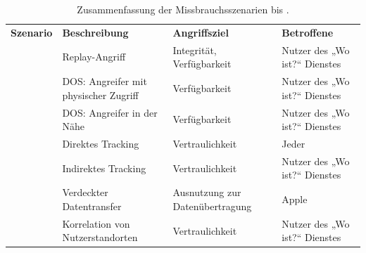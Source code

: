 \begin{table}[ht]
  \caption{Zusammenfassung der Missbrauchsszenarien  bis .}
  \label{tab:missbrauchsszenarien}
  \begin{tabularx}{\textwidth}{ |l|X|X|X| }
    \hline
    \textbf{Szenario} & \textbf{Beschreibung} & \textbf{Angriffsziel} & \textbf{Betroffene}\\
    \Xhline{0.5mm}
    \hline
    \nameref{missbrauch:1} & Replay-Angriff & Integrität, Verfügbarkeit & Nutzer des „Wo ist?“ Dienstes \\
    \hline
    \nameref{missbrauch:2.1} & \ac{DOS}: Angreifer mit physischer Zugriff & Verfügbarkeit & Nutzer des „Wo ist?“ Dienstes \\
    \hline
    \nameref{missbrauch:2.2} & \ac{DOS}: Angreifer in der Nähe & Verfügbarkeit & Nutzer des „Wo ist?“ Dienstes \\
    \hline
    \nameref{missbrauch:3} & Direktes Tracking & Vertraulichkeit & Jeder \\
    \hline
    \nameref{missbrauch:4} & Indirektes Tracking & Vertraulichkeit & Nutzer des „Wo ist?“ Dienstes  \\
    \hline
    \nameref{missbrauch:5} & Verdeckter Datentransfer & Ausnutzung zur Datenübertragung & Apple \\
    \hline
    \nameref{missbrauch:6} & Korrelation von Nutzerstandorten & Vertraulichkeit & Nutzer des „Wo ist?“ Dienstes \\
    \hline
  \end{tabularx}
\end{table}
